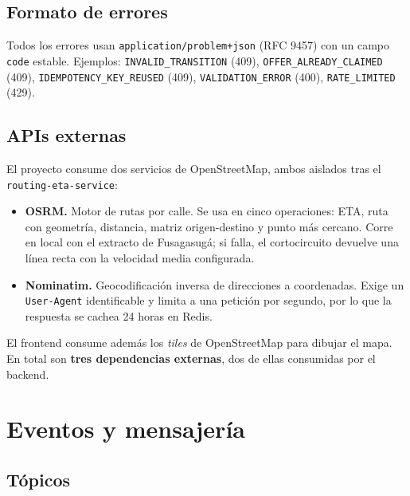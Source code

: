 \documentclass[conference]{IEEEtran}
\newcommand{\pkg}[1]{\texttt{#1}}
\begin{document}
\subsection{Formato de errores}

Todos los errores usan \pkg{application/problem+json} (RFC 9457) con un campo \pkg{code}
estable. Ejemplos: \pkg{INVALID\_TRANSITION} (409), \pkg{OFFER\_ALREADY\_CLAIMED} (409),
\pkg{IDEMPOTENCY\_KEY\_REUSED} (409), \pkg{VALIDATION\_ERROR} (400), \pkg{RATE\_LIMITED} (429).

\subsection{APIs externas}

El proyecto consume dos servicios de OpenStreetMap, ambos aislados tras el
\pkg{routing-eta-service}:

\begin{itemize}[leftmargin=1.2cm]
  \item \textbf{OSRM.} Motor de rutas por calle. Se usa en cinco operaciones: ETA, ruta con
        geometr\'ia, distancia, matriz origen-destino y punto m\'as cercano. Corre en local con el
        extracto de Fusagasug\'a; si falla, el cortocircuito devuelve una l\'inea recta con la
        velocidad media configurada.
  \item \textbf{Nominatim.} Geocodificaci\'on inversa de direcciones a coordenadas. Exige un
        \pkg{User-Agent} identificable y limita a una petici\'on por segundo, por lo que la
        respuesta se cachea 24 horas en Redis.
\end{itemize}

El frontend consume adem\'as los \emph{tiles} de OpenStreetMap para dibujar el mapa. En total son
\textbf{tres dependencias externas}, dos de ellas consumidas por el backend.

\clearpage
\section{Eventos y mensajería}

\subsection{Tópicos}
\end{document}
